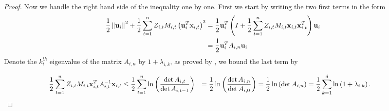 \begin{proof}
Now we handle the right hand side of the inequality one by one. First we start by writing the two first terms 
in the form 
\begin{equation*}
\begin{split}
  \frac{1}{2}\left\Vert {\mathbf{u}_i} \right\Vert^2+\frac{1}{2}\sum_{t=1}^{n}{Z_{i,t}M_{i,t}\left({\mathbf{u}_i^T\mathbf{x}_{i,t}}\right)}^2  
  &= \frac{1}{2}\mathbf{u}_i^T\left({I+\frac{1}{2}\sum_{t=1}^{n}{Z_{i,t}M_{i,t}\mathbf{x}_{i,t}\mathbf{x}_{i,t}^T}}\right)\mathbf{u}_i\\
  &=\frac{1}{2}\mathbf{u}_i^TA_{i,n}\mathbf{u}_i
\end{split}
\end{equation*}
Denote the $k_i^{th}$ eigenvalue of the matrix $A_{i,n}$ by $1+\lambda_{i,k}$, as proved by \cite{Forster},
we  bound the last term  by

\begin{equation*}
\begin{split}
  \frac{1}{2}\sum_{t=1}^{n}Z_{i,t}M_{i,t}\mathbf{x}_{i,t}^TA_{i,t}^{-1}\mathbf{x}_{i,t} 
  &\le \frac{1}{2}\sum_{t=1}^{n}\ln\left({\frac{\det{A_{i,t}}}{\det{A_{i,t-1}}}}\right) 
  &= \frac{1}{2}\ln\left({\frac{\det{A_{i,n}}}{\det{A_{i,0}}}}\right)
  &=\frac{1}{2}\ln\left({\det{A_{i,n}}}\right) = \frac{1}{2}\sum_{k=1}^{d}\ln\left({1+\lambda_{i,k}}\right).
\end{split}
\end{equation*}


\end{proof}
